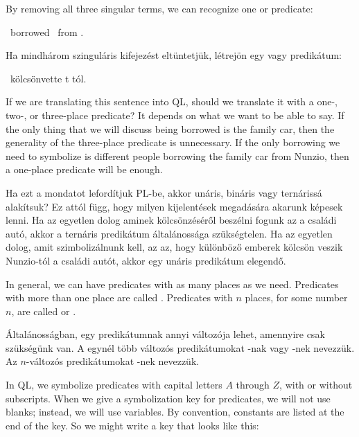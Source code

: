 By removing all three singular terms, we can recognize one  or  predicate:
\begin{center}
\blank\ borrowed \blank\ from \blank.
\end{center}

Ha mindhárom szinguláris kifejezést eltüntetjük, létrejön egy  vagy  predikátum:
\begin{center}
\blank\ kölcsönvette \blank\-t \blank\-tól.
\end{center}

If we are translating this sentence into QL, should we translate it with a one-, two-, or three-place predicate? It depends on what we want to be able to say. If the only thing that we will discuss being borrowed is the family car, then the generality of the three-place predicate is unnecessary. If the only borrowing we need to symbolize is different people borrowing the family car from Nunzio, then a one-place predicate will be enough.

Ha ezt a mondatot lefordítjuk PL-be, akkor unáris, bináris vagy ternárissá alakítsuk? Ez attól függ, hogy milyen kijelentések megadására akarunk képesek lenni. Ha az egyetlen dolog aminek kölcsönzéséről beszélni fogunk az a családi autó, akkor a ternáris predikátum általánossága szükségtelen. Ha az egyetlen dolog, amit szimbolizálnunk kell, az az, hogy különböző emberek kölcsön veszik Nunzio-tól a családi autót, akkor egy unáris predikátum elegendő.



In general, we can have predicates with as many places as we need. Predicates with more than one place are called . Predicates with $n$ places, for some number $n$, are called  or .

Általánosságban, egy predikátumnak annyi változója lehet, amennyire csak szükségünk van. A egynél több változós predikátumokat -nak
vagy -nek nevezzük. Az $n$-változós predikátumokat -nek nevezzük.

In QL, we symbolize predicates with capital letters $A$ through $Z$, with or without subscripts. When we give a symbolization key for predicates, we will not use blanks; instead, we will use variables. By convention, constants are listed at the end of the key. So we might write a key that looks like this:

